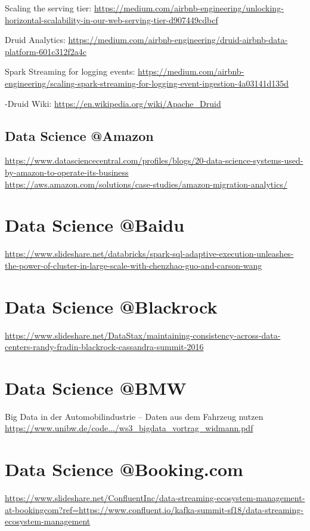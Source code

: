 \documentclass[12pt, numbers=noenddot]{scrreprt} %
\begin{document}
Scaling the serving tier:
\url{https://medium.com/airbnb-engineering/unlocking-horizontal-scalability-in-our-web-serving-tier-d907449cdbcf}

Druid Analytics:
\url{https://medium.com/airbnb-engineering/druid-airbnb-data-platform-601c312f2a4c}

Spark Streaming for logging events:
\url{https://medium.com/airbnb-engineering/scaling-spark-streaming-for-logging-event-ingestion-4a03141d135d}

-Druid Wiki:
\url{https://en.wikipedia.org/wiki/Apache_Druid}

\subsection{Data Science @Amazon}
\url{https://www.datasciencecentral.com/profiles/blogs/20-data-science-systems-used-by-amazon-to-operate-its-business} \\
\url{https://aws.amazon.com/solutions/case-studies/amazon-migration-analytics/}

\section{Data Science @Baidu}
\url{https://www.slideshare.net/databricks/spark-sql-adaptive-execution-unleashes-the-power-of-cluster-in-large-scale-with-chenzhao-guo-and-carson-wang}

\section{Data Science @Blackrock}
\url{https://www.slideshare.net/DataStax/maintaining-consistency-across-data-centers-randy-fradin-blackrock-cassandra-summit-2016}

\section{Data Science @BMW}
Big Data in der Automobilindustrie – Daten aus dem Fahrzeug nutzen \url{https://www.unibw.de/code.../ws3_bigdata_vortrag_widmann.pdf}

\section{Data Science @Booking.com}
\url{https://www.slideshare.net/ConfluentInc/data-streaming-ecosystem-management-at-bookingcom?ref=https://www.confluent.io/kafka-summit-sf18/data-streaming-ecosystem-management}
\end{document}
